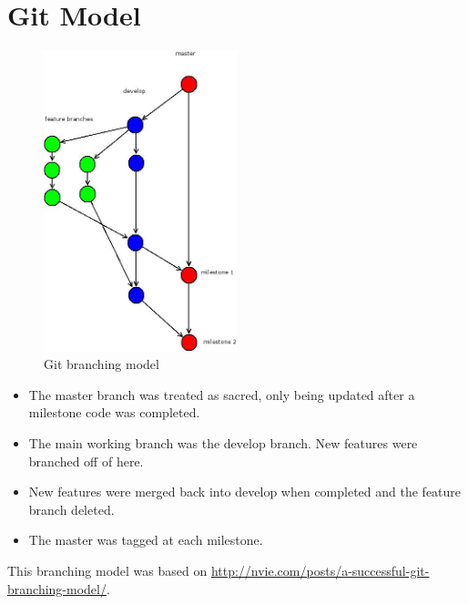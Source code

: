 \section{Git Model}
\label{apx:git}

\begin{figure}[h!]
  \caption{Git branching model}
  \centering
    \includegraphics[width=0.5\textwidth]{gitbranch.jpg}
\end{figure}

\begin{itemize}
    \item The master branch was treated as sacred, only being updated after
    a milestone code was completed.
    \item The main working branch was the develop branch. New features were
    branched off of here.
    \item New features were merged back into develop when completed and the
    feature branch deleted.
    \item The master was tagged at each milestone.
\end{itemize}

This branching model was based on
\url{http://nvie.com/posts/a-successful-git-branching-model/}.

